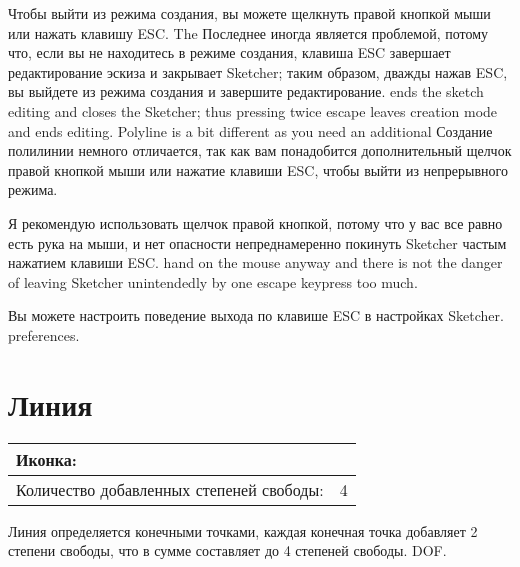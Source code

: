 \documentclass[12pt,titlepage]{article}
\newcommand{\icon}[1]{\raisebox{-1em}{\rule{0pt}{27pt}\texttt{[image: images/\#1]}}}
\newcommand{\dofAdded}{Количество добавленных степеней свободы:}
\begin{document}
Чтобы выйти из режима создания, вы можете щелкнуть правой кнопкой мыши или нажать клавишу ESC. The
Последнее иногда является проблемой, потому что, если вы не находитесь в режиме создания, клавиша ESC завершает редактирование эскиза и закрывает Sketcher; таким образом, дважды нажав ESC, вы выйдете из режима создания и завершите редактирование.
ends the sketch editing and closes the Sketcher; thus pressing twice escape leaves
creation mode and ends editing. Polyline is a bit different as you need an additional
Создание полилинии немного отличается, так как вам понадобится дополнительный щелчок правой кнопкой мыши или нажатие клавиши ESC, чтобы выйти из непрерывного режима.

Я рекомендую использовать щелчок правой кнопкой, потому что у вас все равно есть рука на мыши, и нет опасности непреднамеренно покинуть Sketcher частым нажатием клавиши ESC.
hand on the mouse anyway and there is not the danger of leaving Sketcher unintendedly
by one escape keypress too much.

Вы можете настроить поведение выхода по клавише ESC в настройках Sketcher.
preferences.

\section{Линия}
\begin{tabular}{|l|l|}
\hline
Иконка: & \icon{Sketcher_CreateLine}\\
\hline
\dofAdded & 4\\
\hline
\end{tabular}

Линия определяется конечными точками, каждая конечная точка добавляет 2 степени свободы, что в сумме составляет до 4 степеней свободы.
DOF.
\end{document}
